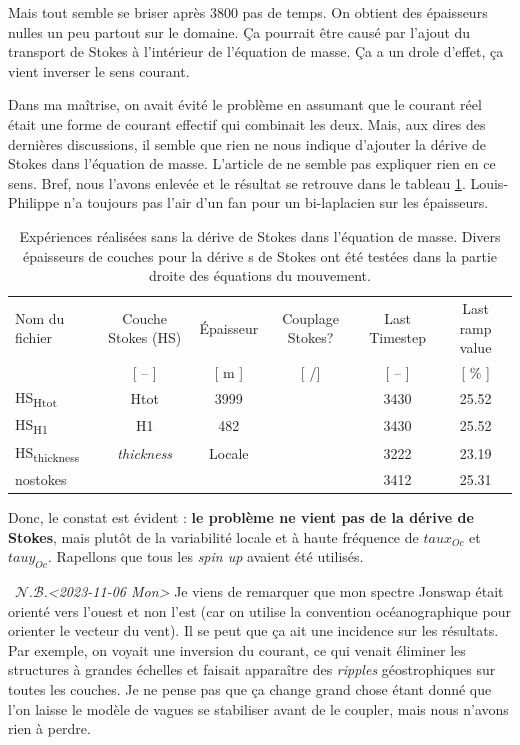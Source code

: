 \documentclass[10pt]{article}
\numberwithin{equation}{section}
\newcommand{\nb}{\raisebox{0.8pt}{\scriptsize\textleaf}\ $\mathscr{N. B.}$\hspace{4pt}}
\newcommand{\cmark}{\ding{52}}
\newcommand{\xmark}{\ding{55}}
\begin{document}
Mais tout semble se briser après 3800 pas de temps.
On obtient des épaisseurs nulles un peu partout sur le domaine.
Ça pourrait être causé par l'ajout du transport de Stokes à l'intérieur de l'équation de masse.
Ça a un drole d'effet, ça vient inverser le sens courant. \bigskip

Dans ma maîtrise, on avait évité le problème en assumant que le courant réel était une forme de courant effectif qui combinait les deux.
Mais, aux dires des dernières discussions, il semble que rien ne nous indique d'ajouter la dérive de Stokes dans l'équation de masse.
L'article de  ne semble pas expliquer rien en ce sens.
Bref, nous l'avons enlevée et le résultat se retrouve dans le tableau \ref{tab:org33c75ed}.
Louis-Philippe n'a toujours pas l'air d'un fan pour un bi-laplacien sur les épaisseurs.

\begin{table}[htbp]
\caption{\label{tab:org33c75ed}Expériences réalisées sans la dérive de Stokes dans l'équation de masse. Divers épaisseurs de couches pour la dérive s de Stokes ont été testées dans la partie droite des équations du mouvement.}
\centering
\begin{tabular}{lccccc}
\hline
\hline
Nom du fichier & Couche Stokes (HS) & Épaisseur & Couplage Stokes? & Last Timestep & Last ramp value\\[0pt]
[ -- ] & [ -- ] & [ m ] & [ \cmark/\xmark ] & [ -- ] & [ \% ]\\[0pt]
\hline
HS\textsubscript{Htot} & Htot & 3999 & \cmark & 3430 & 25.52\\[0pt]
HS\textsubscript{H1} & H1 & 482 & \cmark & 3430 & 25.52\\[0pt]
HS\textsubscript{thickness} & \emph{thickness} & Locale & \cmark & 3222 & 23.19\\[0pt]
nostokes & \xmark & \xmark & \xmark & 3412 & 25.31\\[0pt]
\hline
\end{tabular}
\end{table}

Donc, le constat est évident : \textbf{le problème ne vient pas de la dérive de Stokes}, mais plutôt de la variabilité locale et à haute fréquence de \(taux_{Oc}\) et \(tauy_{Oc}\).
Rapellons que tous les \emph{spin up} avaient été utilisés. \bigskip

\nb \textit{<2023-11-06 Mon> } Je viens de remarquer que mon spectre Jonswap était orienté vers l'ouest et non l'est (car on utilise la convention océanographique pour orienter le vecteur du vent).
Il se peut que ça ait une incidence sur les résultats.
Par exemple, on voyait une inversion du courant, ce qui venait éliminer les structures à grandes échelles et faisait apparaître des \emph{ripples} géostrophiques sur toutes les couches.
Je ne pense pas que ça change grand chose étant donné que l'on laisse le modèle de vagues se stabiliser avant de le coupler, mais nous n'avons rien à perdre. 
\end{document}

